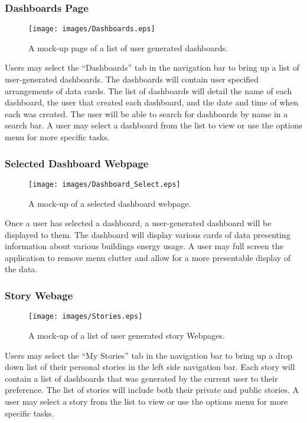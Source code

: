 \documentclass[journal,10pt,onecolumn,compsoc]{IEEEtran}
\begin{document}
	\subsubsection{Dashboards Page}
    \begin{figure}[H]
        \centering
        \texttt{[image: images/Dashboards.eps]}
        \caption{A mock-up page of a list of user generated dashboards.}
    \end{figure}
	Users may select the ``Dashboards'' tab in the navigation bar to bring up a list of user-generated dashboards.
	The dashboards will contain user specified arrangements of data cards. 
	The list of dashboards will detail the name of each dashboard, the user that created each dashboard, and the date and time of when each was created.
	The user will be able to search for dashboards by name in a search bar. 
	A user may select a dashboard from the list to view or use the options menu for more specific tasks.
	
    \subsubsection{Selected Dashboard Webpage}
    \begin{figure}[H]
        \centering
        \texttt{[image: images/Dashboard\_Select.eps]}
        \caption{A mock-up of a selected dashboard webpage.}
    \end{figure}
	Once a user has selected a dashboard, a user-generated dashboard will be displayed to them.
	The dashboard will display various cards of data presenting information about various buildings energy usage.
	A user may full screen the application to remove menu clutter and allow for a more presentable display of the data.
	
    \subsubsection{Story Webage}
    \begin{figure}[H]
        \centering
        \texttt{[image: images/Stories.eps]}
        \caption{A mock-up of a list of user generated story Webpages.}
    \end{figure}
	Users may select the ``My Stories'' tab in the navigation bar to bring up a drop down list of their personal stories in the left side navigation bar.
	Each story will contain a list of dashboards that was generated by the current user to their preference. 
	The list of stories will include both their private and public stories.
	A user may select a story from the list to view or use the options menu for more specific tasks.
	
	
    
    
\end{document}
